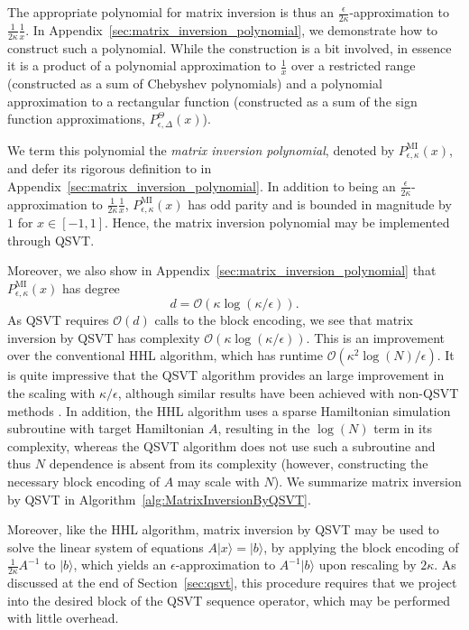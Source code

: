 \documentclass[aps,pra,showpacs,notitlepage,twocolumn,superscriptaddress,nofootinbib]{revtex4-1}
\begin{document}
    The appropriate polynomial for matrix inversion is thus an $\frac{\epsilon}{2 \kappa}$-approximation to $\frac{1}{2 \kappa} \frac{1}{x}$. In Appendix~\ref{sec:matrix_inversion_polynomial}, we demonstrate how to construct such a polynomial. While the construction is a bit involved, in essence it is a product of a polynomial approximation to $\frac{1}{x}$ over a restricted range (constructed as a sum of Chebyshev polynomials) and a polynomial approximation to a rectangular function (constructed as a sum of the sign function approximations, $P^{\Theta}_{\epsilon, \Delta}(x)$). 
    
    We term this polynomial the \textit{matrix inversion polynomial}, denoted by $P^{\text{MI}}_{\epsilon,\kappa}(x)$, and defer its rigorous definition to in Appendix~\ref{sec:matrix_inversion_polynomial}. In addition to being an $\frac{\epsilon}{2 \kappa}$-approximation to $\frac{1}{2 \kappa} \frac{1}{x}$, $P^{\text{MI}}_{\epsilon,\kappa}(x)$ has odd parity and is bounded in magnitude by $1$ for $x \in [-1,1]$. Hence, the matrix inversion polynomial may be implemented through QSVT.
    
    Moreover, we also show in Appendix~\ref{sec:matrix_inversion_polynomial} that $P^{\text{MI}}_{\epsilon,\kappa}(x)$  has degree 
    \begin{equation}
        d = \mathcal{O}(\kappa \log(\kappa/\epsilon)).
    \end{equation}
    As QSVT requires $\mathcal{O}(d)$ calls to the block encoding, we see that matrix inversion by QSVT has complexity $\mathcal{O}(\kappa \log(\kappa/\epsilon))$. This is an improvement over the conventional HHL algorithm, which has runtime $\mathcal{O}(\kappa^2 \log(N) / \epsilon)$. It is quite impressive that the QSVT algorithm provides an large improvement in the scaling with $\kappa/\epsilon$, although similar results have been achieved with non-QSVT methods \cite{Childs_2017}. In addition, the HHL algorithm uses a sparse Hamiltonian simulation subroutine with target Hamiltonian $A$, resulting in the $\log(N)$ term in its complexity, whereas the QSVT algorithm does not use such a subroutine and thus $N$ dependence is absent from its complexity (however, constructing the necessary block encoding of $A$ may scale with $N$). We summarize matrix inversion by QSVT in Algorithm~\ref{alg:MatrixInversionByQSVT}.
    
    Moreover, like the HHL algorithm, matrix inversion by QSVT may be used to solve the linear system of equations $A|x\rangle = |b\rangle$, by applying the block encoding of $\frac{1}{2\kappa} A^{-1}$ to $|b\rangle$, which yields an $\epsilon$-approximation to $A^{-1} |b\rangle$ upon rescaling by $2\kappa$. As discussed at the end of Section~\ref{sec:qsvt}, this procedure requires that we project into the desired block of the QSVT sequence operator, which may be performed with little overhead. 
    
\end{document}
